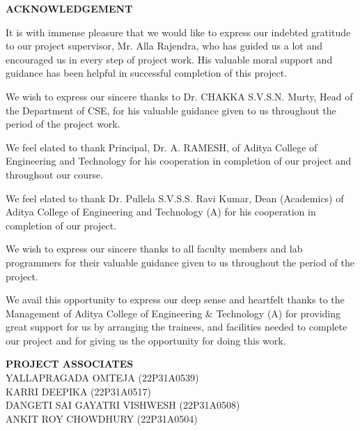 \begin{center}
\textbf{\Large ACKNOWLEDGEMENT}
\end{center}

\vspace{0.8cm}

\noindent
It is with immense pleasure that we would like to express our indebted gratitude to our project supervisor,
Mr. Alla Rajendra, who has guided us a lot and encouraged us in every step of project work.
His valuable moral support and guidance has been helpful in successful completion of this project.

\vspace{0.3cm}

\noindent
We wish to express our sincere thanks to Dr. CHAKKA S.V.S.N. Murty, Head of the Department of CSE,
for his valuable guidance given to us throughout the period of the project work.

\vspace{0.3cm}

\noindent
We feel elated to thank Principal, Dr. A. RAMESH, of Aditya College of Engineering and Technology
for his cooperation in completion of our project and throughout our course.

\vspace{0.3cm}

\noindent
We feel elated to thank Dr. Pullela S.V.S.S. Ravi Kumar, Dean (Academics) of Aditya College of Engineering and Technology (A)
for his cooperation in completion of our project.

\vspace{0.3cm}

\noindent
We wish to express our sincere thanks to all faculty members and lab programmers for their valuable guidance
given to us throughout the period of the project.

\vspace{0.3cm}

\noindent
We avail this opportunity to express our deep sense and heartfelt thanks to the Management of
Aditya College of Engineering \& Technology (A) for providing great support for us by arranging the trainees,
and facilities needed to complete our project and for giving us the opportunity for doing this work.

\vspace{2cm}

\begin{flushright}
\textbf{PROJECT ASSOCIATES}\\[0.5cm]

YALLAPRAGADA OMTEJA (22P31A0539)\\
KARRI DEEPIKA (22P31A0517)\\
DANGETI SAI GAYATRI VISHWESH (22P31A0508)\\
ANKIT ROY CHOWDHURY (22P31A0504)
\end{flushright}